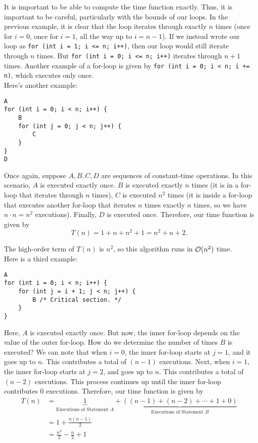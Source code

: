 It is important to be able to compute the time function exactly. Thus, it is important to be careful, particularly with the bounds of our loops. In the previous example, it is clear that the loop iterates through exactly $n$ times (once for $i = 0$, once for $i = 1$, all the way up to $i = n - 1$). If we instead wrote our loop as \verb!for (int i = 1; i <= n; i++)!, then our loop would still iterate through $n$ times. But \verb!for (int i = 0; i <= n; i++)! iterates through $n + 1$ times. Another example of a for-loop is given by \verb!for (int i = 0; i < n; i += n)!, which executes only once. \\


Here's another example:

\begin{lstlisting}
A
for (int i = 0; i < n; i++) {
    B
    for (int j = 0; j < n; j++) {
        C
    }
}
D
\end{lstlisting}

Once again, suppose $A, B, C, D$ are sequences of constant-time operations. In this scenario, $A$ is executed exactly once. $B$ is executed exactly $n$ times (it is in a for-loop that iterates through $n$ times), $C$ is executed $n^{2}$ times (it is inside a for-loop that executes another for-loop that iterates $n$ times exactly $n$ times, so we have $n \cdot n = n^{2}$ executions).  Finally, $D$ is executed once. Therefore, our time function is given by
\[
T(n) = 1 + n + n^{2} + 1 = n^{2} + n + 2.
\]

The high-order term of $T(n)$ is $n^{2}$, so this algorithm runs in $\mathcal{O}(n^2)$ time.  \\

Here is a third example:

\begin{lstlisting}
A
for (int i = 0; i < n; i++) {
    for (int j = i + 1; j < n; j++) {
        B /* Critical section. */
    }
}
\end{lstlisting}

Here, $A$ is executed exactly once. But now, the inner for-loop depends on the value of the outer for-loop. How do we determine the number of times $B$ is executed? We can note that when $i = 0$, the inner for-loop starts at $j = 1$, and it goes up to $n$. This contributes a total of $(n - 1)$ executions. Next, when $i = 1$, the inner for-loop starts at $j = 2$, and goes up to $n$. This contributes a total of $(n - 2)$ executions. This process continues up until the inner for-loop contributes $0$ executions. Therefore, our time function is given by
\begin{align*}
T(n) &= \underbrace{1}_{\text{Executions of Statement $A$}} + \underbrace{\left((n - 1) + (n - 2) + \cdots + 1 + 0\right)}_{\text{Executions of Statement $B$}} \\[1em]
&= 1 + \frac{n(n - 1)}{2} \\[1em]
&= \frac{n^2}{2} - \frac{n}{2} + 1
\end{align*}

